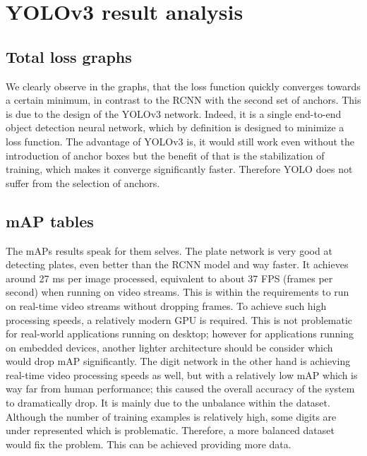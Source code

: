 \section{YOLOv3 result analysis}

\subsection{Total loss graphs}
We clearly observe in the graphs, that the loss function quickly converges towards a certain minimum, in contrast to the RCNN with the second set of anchors. This is due to the design of the YOLOv3 network. Indeed, it is a single end-to-end object detection neural network, which by definition is designed to minimize a loss function. The advantage of YOLOv3 is, it would still work even without the introduction of anchor boxes but the benefit of that is the stabilization of training, which makes it converge significantly faster. Therefore YOLO does not suffer from the selection of anchors.

\subsection{mAP tables}
The mAPs results speak for them selves. The plate network is very good at detecting plates, even better than the RCNN model and way faster. It achieves around 27 ms per image processed, equivalent to about 37 FPS (frames per second) when running on video streams. This is within the requirements to run on real-time video streams without dropping frames. To achieve such high processing speeds, a relatively modern GPU is required. This is not problematic for real-world applications running on desktop; however for applications running on embedded devices, another lighter architecture should be consider which would drop mAP significantly. The digit network in the other hand is achieving real-time video processing speeds as well, but with a relatively low mAP which is way far from human performance; this caused the overall accuracy of the system to dramatically drop. It is mainly due to the unbalance within the dataset. Although the number of training examples is relatively high, some digits are under represented which is problematic. Therefore, a more balanced dataset would fix the problem. This can be achieved providing more data.

